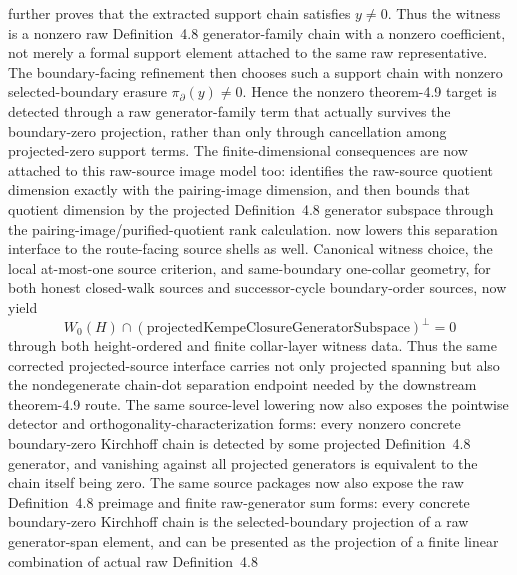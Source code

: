 \documentclass[11pt]{article}
\begin{document}
further proves that the extracted support chain satisfies \(y \ne 0\).  Thus
the witness is a nonzero raw Definition~4.8 generator-family chain with a
nonzero coefficient, not merely a formal support element attached to the same
raw representative.  The boundary-facing refinement
then chooses such a support chain with nonzero selected-boundary erasure
\(\pi_{\partial}(y) \ne 0\).  Hence the nonzero theorem-4.9 target is detected
through a raw generator-family term that actually survives the boundary-zero
projection, rather than only through cancellation among projected-zero support
terms.  The
finite-dimensional consequences are now attached to this
raw-source image model too:
identifies the raw-source quotient dimension exactly with the pairing-image
dimension, and
then bounds that quotient dimension by the projected Definition~4.8 generator
subspace through the pairing-image/purified-quotient rank calculation.
 now lowers this separation
interface to the route-facing source shells as well.  Canonical witness choice,
the local at-most-one source criterion, and same-boundary one-collar geometry,
for both honest closed-walk sources and successor-cycle boundary-order sources,
now yield
\[
  W_0(H) \cap (\mathrm{projectedKempeClosureGeneratorSubspace})^\perp = 0
\]
through both height-ordered and finite collar-layer witness data.  Thus the
same corrected projected-source interface carries not only projected spanning
but also the nondegenerate chain-dot separation endpoint needed by the
downstream theorem-4.9 route.  The same source-level lowering now also exposes
the pointwise detector and orthogonality-characterization forms: every nonzero
concrete boundary-zero Kirchhoff chain is detected by some projected
Definition~4.8 generator, and vanishing against all projected generators is
equivalent to the chain itself being zero.  The same source packages now also
expose the raw Definition~4.8 preimage and finite raw-generator sum forms:
every concrete boundary-zero Kirchhoff chain is the selected-boundary
projection of a raw generator-span element, and can be presented as the
projection of a finite linear combination of actual raw Definition~4.8
\end{document}
